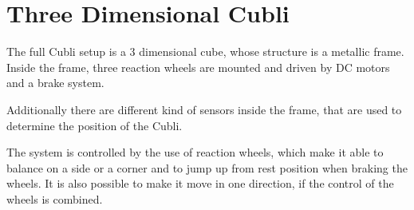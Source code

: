 \section{Three Dimensional Cubli}\label{threeDCubli}

The full Cubli setup is a 3 dimensional cube, whose structure is a metallic frame. Inside the frame, three reaction wheels are mounted and driven by DC motors and a brake system. 

Additionally there are different kind of sensors inside the frame, that are used to determine the position of the Cubli.

The system is controlled by the use of reaction wheels, which make it able to balance on a side or a corner and to jump up from rest position when braking the wheels. It is also possible to make it move in one direction, if the control of the wheels is combined.%